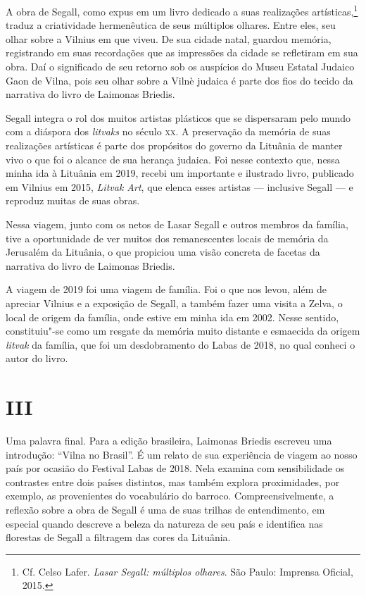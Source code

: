 A obra de Segall, como expus em um livro dedicado a suas realizações
artísticas,\footnote{Cf. Celso Lafer. \textit{Lasar Segall: múltiplos
  olhares}. São Paulo: Imprensa Oficial, 2015.} traduz a criatividade
hermenêutica de seus múltiplos olhares. Entre eles, seu olhar sobre a
Vilnius em que viveu. De sua cidade natal, guardou memória, registrando
em suas recordações que as impressões da cidade se refletiram em sua
obra. Daí o significado de seu retorno sob os auspícios do Museu Estatal
Judaico Gaon de Vilna, pois seu olhar sobre a Vilnè judaica é parte dos
fios do tecido da narrativa do livro de Laimonas Briedis.

Segall integra o rol dos muitos artistas plásticos que se dispersaram
pelo mundo com a diáspora dos \textit{litvaks} no século \textsc{xx}. A preservação
da memória de suas realizações artísticas é parte dos propósitos do
governo da Lituânia de manter vivo o que foi o alcance de sua herança
judaica. Foi nesse contexto que, nessa minha ida à Lituânia em 2019,
recebi um importante e ilustrado livro, publicado em Vilnius em 2015,
\textit{Litvak Art}, que elenca esses artistas --- inclusive Segall --- e
reproduz muitas de suas obras.

Nessa viagem, junto com os netos de Lasar Segall e outros membros da
família, tive a oportunidade de ver muitos dos remanescentes locais de
memória da Jerusalém da Lituânia, o que propiciou uma visão concreta de
facetas da narrativa do livro de Laimonas Briedis.

A viagem de 2019 foi uma viagem de família. Foi o que nos levou, além de
apreciar Vilnius e a exposição de Segall, a também fazer uma visita a
Zelva, o local de origem da família, onde estive em minha ida em 2002.
Nesse sentido, constituiu"-se como um resgate da memória muito distante e
esmaecida da origem \textit{litvak} da família, que foi um desdobramento
do Labas de 2018, no qual conheci o autor do livro.

\section{III}

Uma palavra final. Para a edição brasileira, Laimonas Briedis escreveu
uma introdução: ``Vilna no Brasil''. É um relato de sua experiência de
viagem ao nosso país por ocasião do Festival Labas de 2018. Nela examina
com sensibilidade os contrastes entre dois países distintos, mas também
explora proximidades, por exemplo, as provenientes do vocabulário do
barroco. Compreensivelmente, a reflexão sobre a obra de Segall é uma de
suas trilhas de entendimento, em especial quando descreve a beleza da
natureza de seu país e identifica nas florestas de Segall a filtragem
das cores da Lituânia.

